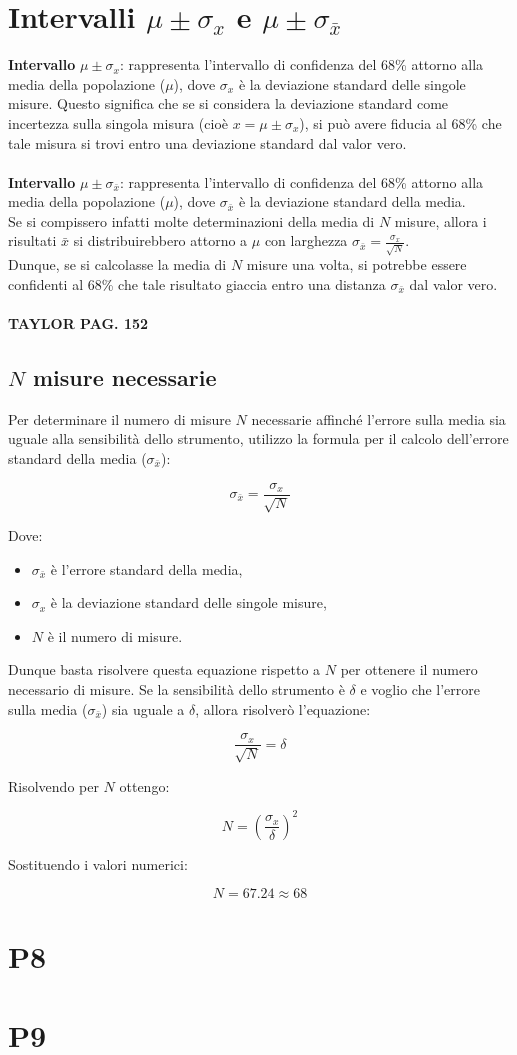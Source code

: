 \documentclass{article}
\begin{document}
\section{Intervalli $\mu \pm \sigma_x$ e $\mu \pm \sigma_{\bar{x}}$} 
\textbf{Intervallo} $\mu \pm \sigma_x$: rappresenta l'intervallo di confidenza del 68\% attorno alla media della popolazione ($\mu$), dove $\sigma_x$ è la deviazione standard delle singole misure. Questo significa che se si considera la deviazione standard come incertezza sulla singola misura (cioè $x = \mu \pm \sigma_x$), si può avere fiducia al 68\% che tale misura si trovi entro una deviazione standard dal valor vero.
\\\\ \noindent\textbf{Intervallo} $\mu \pm \sigma_{\bar{x}}$: rappresenta l'intervallo di confidenza del 68\% attorno alla media della popolazione ($\mu$), dove $\sigma_{\bar{x}}$ è la deviazione standard della media.
\\Se si compissero infatti molte determinazioni della media di $N$ misure, allora i risultati $\bar{x}$ si distribuirebbero attorno a $\mu$ con larghezza $\sigma_{\bar{x}} =  \frac{\sigma_x}{\sqrt{N}} $.
\\ Dunque, se si calcolasse la media di $N$ misure una volta, si potrebbe essere confidenti al 68\% che tale risultato giaccia entro una distanza $ \sigma_{\bar{x}}$ dal valor vero.
\\\\ \textbf{TAYLOR PAG. 152}

\subsection{$N$ misure necessarie}
Per determinare il numero di misure $N$ necessarie affinché l'errore sulla media sia uguale alla sensibilità dello strumento, utilizzo la formula per il calcolo dell'errore standard della media ($\sigma_{\bar{x}}$):

\[\sigma_{\bar{x}} = \frac{\sigma_x}{\sqrt{N}}\]

\noindent Dove:
\begin{itemize}
  \item $\sigma_{\bar{x}}$ è l'errore standard della media,
  \item $\sigma_x$ è la deviazione standard delle singole misure,
  \item $N$ è il numero di misure.
\end{itemize}

\noindent Dunque basta risolvere questa equazione rispetto a $N$ per ottenere il numero necessario di misure. Se la sensibilità dello strumento è $\delta$ e voglio che l'errore sulla media ($\sigma_{\bar{x}}$) sia uguale a $\delta$, allora risolverò l'equazione:

\[\frac{\sigma_x}{\sqrt{N}} = \delta\]

\noindent Risolvendo per $N$ ottengo:

\[N = \left( \frac{\sigma_x}{\delta} \right)^2\]

\noindent Sostituendo i valori numerici:

\[N = 67.24 \approx 68 \]

\section{P8}



\section{P9}
\end{document}
